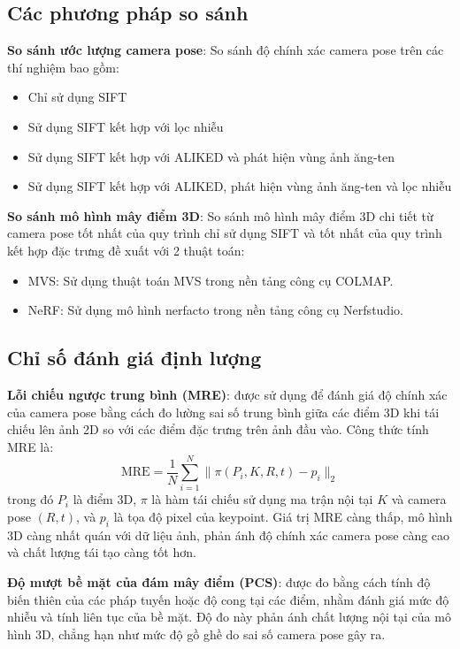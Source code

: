     \subsection{Các phương pháp so sánh}
    \label{subsec:exp_baselines}
    \textbf{So sánh ước lượng camera pose}: So sánh độ chính xác camera pose trên các thí nghiệm bao gồm:
        \begin{itemize}
            \item Chỉ sử dụng SIFT
            \item Sử dụng SIFT kết hợp với lọc nhiễu
            \item Sử dụng SIFT kết hợp với ALIKED và phát hiện vùng ảnh ăng-ten
            \item Sử dụng SIFT kết hợp với ALIKED, phát hiện vùng ảnh ăng-ten và lọc nhiễu
        \end{itemize}
    \textbf{So sánh mô hình mây điểm 3D}: So sánh mô hình mây điểm 3D chi tiết từ camera pose tốt nhất của quy trình chỉ sử dụng SIFT và tốt nhất của quy trình kết hợp đặc trưng đề xuất với 2 thuật toán:
        \begin{itemize}
            \item MVS: Sử dụng thuật toán MVS trong nền tảng công cụ COLMAP.
            \item NeRF: Sử dụng mô hình nerfacto trong nền tảng công cụ Nerfstudio.
        \end{itemize}
    
    \subsection{Chỉ số đánh giá định lượng}
    \label{subsec:exp_metrics}
    \textbf{Lỗi chiếu ngược trung bình (MRE)}: được sử dụng để đánh giá độ chính xác của camera pose bằng cách đo lường sai số trung bình giữa các điểm 3D khi tái chiếu lên ảnh 2D so với các điểm đặc trưng trên ảnh đầu vào. Công thức tính MRE là: 
    \begin{equation}
        \text{MRE} = \frac{1}{N} \sum_{i=1}^N \|\pi(P_i, K, R, t) - p_i\|_2     
    \end{equation}
    trong đó \(P_i\) là điểm 3D, \(\pi\) là hàm tái chiếu sử dụng ma trận nội tại \(K\) và camera pose \((R, t)\), và \(p_i\) là tọa độ pixel của keypoint. Giá trị MRE càng thấp, mô hình 3D càng nhất quán với dữ liệu ảnh, phản ánh độ chính xác camera pose càng cao và chất lượng tái tạo càng tốt hơn.
    
    \textbf{Độ mượt bề mặt của đám mây điểm (PCS)}: được đo bằng cách tính độ biến thiên của các pháp tuyến hoặc độ cong tại các điểm, nhằm đánh giá mức độ nhiễu và tính liên tục của bề mặt. Độ đo này phản ánh chất lượng nội tại của mô hình 3D, chẳng hạn như mức độ gồ ghề do sai số camera pose gây ra. 

